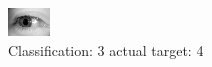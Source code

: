 \begin{figure}[h!]
\begin{center}
\includegraphics[width=0.60\columnwidth]{figures/ID3217_class_3_target_4.png}
\end{center}
\caption{ Classification: 3 actual target: 4}
\label{fig:ID3217_class_3_target_4}
\end{figure}
